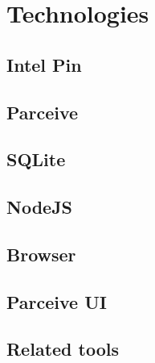 \chapter{Technologies}

\section{Intel Pin}
\section{Parceive}
\section{SQLite}
\section{NodeJS}
\section{Browser}
\section{Parceive UI}
\section{Related tools}